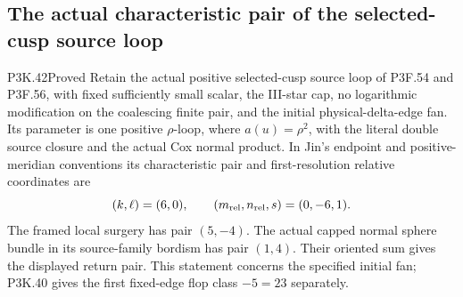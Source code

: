 \subsection{The actual characteristic pair of the selected-cusp source loop}
\begin{statement}{P3K.42}{Proved}
Retain the actual positive selected-cusp source loop of P3F.54 and
P3F.56, with fixed sufficiently small scalar, the III-star cap, no
logarithmic modification on the coalescing finite pair, and the
initial physical-delta-edge fan. Its parameter is one positive
\(\rho\)-loop, where \(a(u)=\rho^2\), with the literal double
source closure and the actual Cox normal product. In Jin's endpoint
and positive-meridian conventions its characteristic pair and
first-resolution relative coordinates are
\[
       (k,\ell)=(6,0),\qquad
       (m_{\rm rel},n_{\rm rel},s)=(0,-6,1).
\]
The framed local surgery has pair \((5,-4)\). The actual capped
normal sphere bundle in its source-family bordism has pair
\((1,4)\). Their oriented sum gives the displayed return pair.
This statement concerns the specified initial fan; P3K.40 gives
the first fixed-edge flop class \(-5=23\) separately.
\end{statement}
